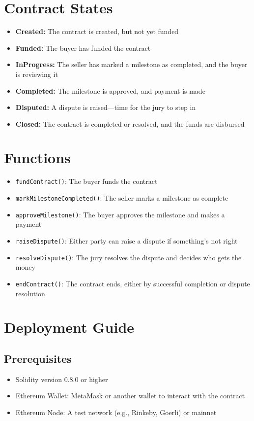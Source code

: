 \documentclass{article}
\begin{document}
\section{Contract States}
\begin{itemize}
    \item \textbf{Created:} The contract is created, but not yet funded
    \item \textbf{Funded:} The buyer has funded the contract
    \item \textbf{InProgress:} The seller has marked a milestone as completed, and the buyer is reviewing it
    \item \textbf{Completed:} The milestone is approved, and payment is made
    \item \textbf{Disputed:} A dispute is raised—time for the jury to step in
    \item \textbf{Closed:} The contract is completed or resolved, and the funds are disbursed
\end{itemize}

\section{Functions}
\begin{itemize}
    \item \texttt{fundContract()}: The buyer funds the contract
    \item \texttt{markMilestoneCompleted()}: The seller marks a milestone as complete
    \item \texttt{approveMilestone()}: The buyer approves the milestone and makes a payment
    \item \texttt{raiseDispute()}: Either party can raise a dispute if something's not right
    \item \texttt{resolveDispute()}: The jury resolves the dispute and decides who gets the money
    \item \texttt{endContract()}: The contract ends, either by successful completion or dispute resolution
\end{itemize}

\section{Deployment Guide}

\subsection{Prerequisites}
\begin{itemize}
    \item Solidity version 0.8.0 or higher
    \item Ethereum Wallet: MetaMask or another wallet to interact with the contract
    \item Ethereum Node: A test network (e.g., Rinkeby, Goerli) or mainnet
\end{itemize}
\end{document}
